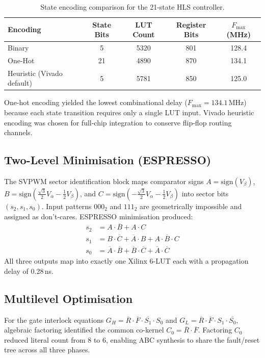 \documentclass[11pt,a4paper]{article}
\begin{document}
\begin{table}[H]\centering\small
\caption{State encoding comparison for the 21-state HLS controller.}\label{tab:encoding}
\begin{tabular}{@{}lcccc@{}}
\toprule
Encoding & State Bits & LUT Count & Register Bits & $F_\text{max}$ (MHz)\\
\midrule
Binary & 5 & 5320 & 801 & 128.4\\
One-Hot & 21 & 4890 & 870 & 134.1\\
Heuristic (Vivado default) & 5 & 5781 & 850 & 125.0\\
\bottomrule
\end{tabular}
\end{table}
One-hot encoding yielded the lowest combinational delay ($F_\text{max} = 134.1$\,MHz) because each state transition requires only a single LUT input. Vivado heuristic encoding was chosen for full-chip integration to conserve flip-flop routing channels.

\subsection{Two-Level Minimisation (ESPRESSO)}
The SVPWM sector identification block maps comparator signs $A = \text{sign}(V_\beta)$, $B = \text{sign}(\frac{\sqrt{3}}{2} V_\alpha - \frac{1}{2} V_\beta)$, and $C = \text{sign}(-\frac{\sqrt{3}}{2} V_\alpha - \frac{1}{2} V_\beta)$ into sector bits $(s_2, s_1, s_0)$. Input patterns $000_2$ and $111_2$ are geometrically impossible and assigned as don't-cares. ESPRESSO minimisation produced:
\begin{align}
s_2 &= A \cdot \overline{B} + A \cdot C\\
s_1 &= B \cdot \overline{C} + \overline{A} \cdot B + A \cdot \overline{B} \cdot C\\
s_0 &= \overline{A} \cdot \overline{B} + \overline{B} \cdot \overline{C} + \overline{A} \cdot \overline{C}
\end{align}
All three outputs map into exactly one Xilinx 6-LUT each with a propagation delay of 0.28\,ns.

\subsection{Multilevel Optimisation}
For the gate interlock equations $G_H = \overline{R} \cdot \overline{F} \cdot \overline{S_1} \cdot S_0$ and $G_L = \overline{R} \cdot \overline{F} \cdot S_1 \cdot \overline{S_0}$, algebraic factoring identified the common co-kernel $C_0 = \overline{R} \cdot \overline{F}$. Factoring $C_0$ reduced literal count from 8 to 6, enabling ABC synthesis to share the fault/reset tree across all three phases.
\end{document}
